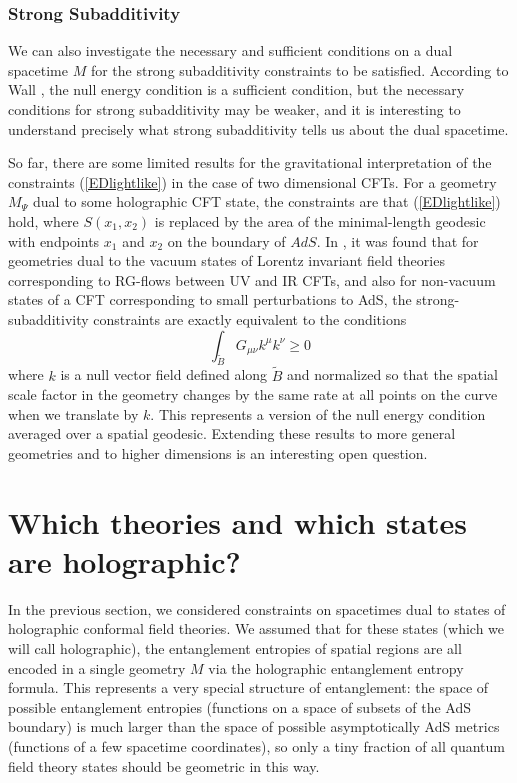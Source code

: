 \documentclass[12pt,epsf]{article}
\newcommand{\be}{\begin{equation}}
\newcommand{\ee}{\end{equation}}
\begin{document}
\subsubsection{Strong Subadditivity}

We can also investigate the necessary and sufficient conditions on a dual spacetime $M$ for the strong subadditivity constraints to be satisfied. According to Wall \cite{Wall:2012uf}, the null energy condition is a sufficient condition, but the necessary conditions for strong subadditivity may be weaker, and it is interesting to understand precisely what strong subadditivity tells us about the dual spacetime.

So far, there are some limited results \cite{Lashkari:2014kda,Bhattacharya:2014vja} for the gravitational interpretation of the constraints (\ref{EDlightlike}) in the case of two dimensional CFTs. For a geometry $M_\Psi$ dual to some holographic CFT state, the constraints are that (\ref{EDlightlike}) hold, where $S(x_1,x_2)$ is replaced by the area of the minimal-length geodesic with endpoints $x_1$ and $x_2$ on the boundary of $AdS$. In \cite{Lashkari:2014kda,Bhattacharya:2014vja}, it was found that for geometries dual to the vacuum states of Lorentz invariant field theories corresponding to RG-flows between UV and IR CFTs, and also for non-vacuum states of a CFT corresponding to small perturbations to AdS, the strong-subadditivity constraints are exactly equivalent to the conditions
\be
\label{SSAint}
\int_{\tilde{B}} G_{\mu \nu} k^\mu k^\nu \ge 0
\ee
where $k$ is a null vector field defined along $\tilde{B}$ and normalized so that the spatial scale factor in the geometry changes by the same rate at all points on the curve when we translate by $k$. This represents a version of the null energy condition averaged over a spatial geodesic.
Extending these results to more general geometries and to higher dimensions is an interesting open question.

\section{Which theories and which states are holographic?}

In the previous section, we considered constraints on spacetimes dual to states of holographic conformal field theories. We assumed that for these states (which we will call holographic), the entanglement entropies of spatial regions are all encoded in a single geometry $M$ via the holographic entanglement entropy formula. This represents a very special structure of entanglement:
the space of possible entanglement entropies (functions on a space of subsets of the AdS boundary) is much larger than the space of possible asymptotically AdS metrics (functions of a few spacetime coordinates), so only a tiny fraction of all quantum field theory states should be geometric in this way.
\end{document}
